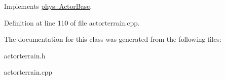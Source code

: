 Implements \hyperlink{classphys_1_1ActorBase_aaa787de7ec5d7d1d8428ea78f37bcb40}{phys::ActorBase}.



Definition at line 110 of file actorterrain.cpp.



The documentation for this class was generated from the following files:\begin{DoxyCompactItemize}
\item 
actorterrain.h\item 
actorterrain.cpp\end{DoxyCompactItemize}
